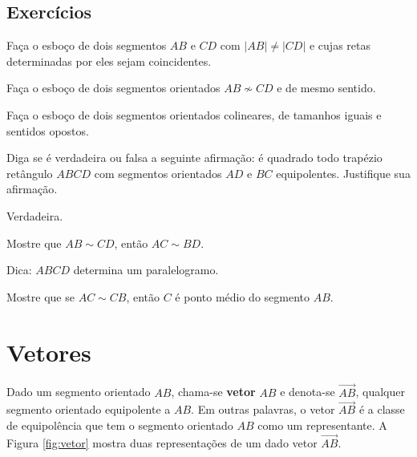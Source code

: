 \subsection*{Exercícios}

\begin{exer}
  Faça o esboço de dois segmentos $AB$ e $CD$ com $|AB|\neq |CD|$ e cujas retas determinadas por eles sejam coincidentes.
\end{exer}

\begin{exer}
  Faça o esboço de dois segmentos orientados $AB\not\sim CD$ e de mesmo sentido.
\end{exer}

\begin{exer}
  Faça o esboço de dois segmentos orientados colineares, de tamanhos iguais e sentidos opostos.
\end{exer}

\begin{exer}
  Diga se é verdadeira ou falsa a seguinte afirmação: é quadrado todo trapézio retângulo $ABCD$ com segmentos orientados $AD$ e $BC$ equipolentes. Justifique sua afirmação. 
\end{exer}
\begin{resp}
  Verdadeira.
\end{resp}

\begin{exer}
  Mostre que $AB\sim CD$, então $AC\sim BD$.
\end{exer}
\begin{resp}
  Dica: $ABCD$ determina um paralelogramo.
\end{resp}

\begin{exer}
  Mostre que se $AC\sim CB$, então $C$ é ponto médio do segmento $AB$.
\end{exer}

\section{Vetores}\label{cap_vetor_sec_vetor}

Dado um segmento orientado $AB$, chama-se {\bf vetor} $AB$ e denota-se $\overrightarrow{AB}$, qualquer segmento orientado equipolente a $AB$. Em outras palavras, o vetor $\overrightarrow{AB}$ é a classe de equipolência que tem o segmento orientado $AB$ como um representante. A Figura \ref{fig:vetor} mostra duas representações de um dado vetor $\overrightarrow{AB}$.

